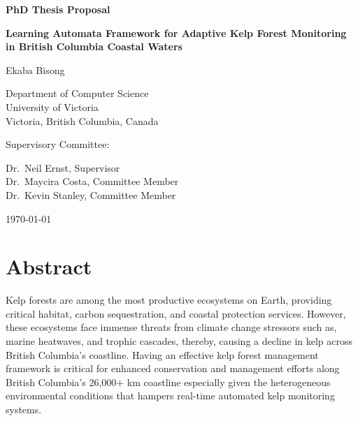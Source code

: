 \documentclass[12pt,oneside]{book}
\begin{document}
\begin{titlepage}
    \centering

    {\Large\bfseries PhD Thesis Proposal\par}
    \vspace{1.5cm}

    {\LARGE\bfseries Learning Automata Framework for Adaptive Kelp Forest Monitoring in British Columbia Coastal Waters\par}

    \vspace{2cm}

    {\Large Ekaba Bisong\par}

    \vspace{1cm}

    {\large Department of Computer Science\\
    University of Victoria\\
    Victoria, British Columbia, Canada\par}

    \vspace{2cm}

    {\large Supervisory Committee:\par}
    \vspace{0.5cm}
    {\large Dr.\ Neil Ernst, Supervisor\\
    Dr.\ Maycira Costa, Committee Member\\
    Dr.\ Kevin Stanley, Committee Member\par}

    \vfill

    {\large \today\par}
\end{titlepage}

\chapter*{Abstract}

Kelp forests are among the most productive ecosystems on Earth, providing critical habitat, carbon sequestration, and coastal protection services. However, these ecosystems face immense threats from climate change stressors such as, marine heatwaves, and trophic cascades, thereby, causing a decline in kelp across British Columbia's coastline. Having an effective kelp forest management framework is critical for enhanced conservation and management efforts along British Columbia's 26,000+ km coastline especially given the heterogeneous environmental conditions that hampers real-time automated kelp monitoring systems.
\end{document}
